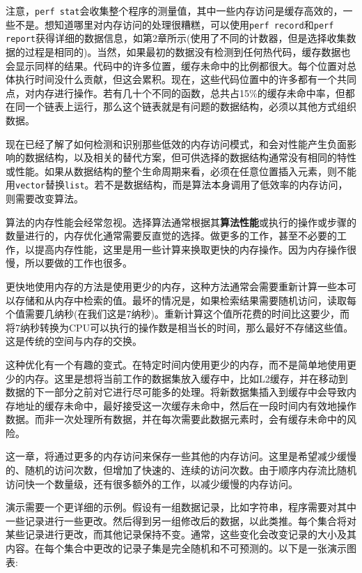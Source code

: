注意，\texttt{perf stat}会收集整个程序的测量值，其中一些内存访问是缓存高效的，一些不是。想知道哪里对内存访问的处理很糟糕，可以使用\texttt{perf record}和\texttt{perf report}获得详细的数据信息，如第2章所示(使用了不同的计数器，但是选择收集数据的过程是相同的)。当然，如果最初的数据没有检测到任何热代码，缓存数据也会显示同样的结果。代码中的许多位置，缓存未命中的比例都很大。每个位置对总体执行时间没什么贡献，但这会累积。现在，这些代码位置中的许多都有一个共同点，对内存进行操作。若有几十个不同的函数，总共占15\%的缓存未命中率，但都在同一个链表上运行，那么这个链表就是有问题的数据结构，必须以其他方式组织数据。

现在已经了解了如何检测和识别那些低效的内存访问模式，和会对性能产生负面影响的数据结构，以及相关的替代方案，但可供选择的数据结构通常没有相同的特性或性能。如果从数据结构的整个生命周期来看，必须在任意位置插入元素，则不能用\texttt{vector}替换\texttt{list}。若不是数据结构，而是算法本身调用了低效率的内存访问，则需要改变算法。


算法的内存性能会经常忽视。选择算法通常根据其\textbf{算法性能}或执行的操作或步骤的数量进行的，内存优化通常需要反直觉的选择。做更多的工作，甚至不必要的工作，以提高内存性能，这里是用一些计算来换取更快的内存操作。因为内存操作很慢，所以要做的工作也很多。

更快地使用内存的方法是使用更少的内存，这种方法通常会需要重新计算一些本可以存储和从内存中检索的值。最坏的情况是，如果检索结果需要随机访问，读取每个值需要几纳秒(在我们这是7纳秒)。重新计算这个值所花费的时间比这要少，而将7纳秒转换为CPU可以执行的操作数是相当长的时间，那么最好不存储这些值。这是传统的空间与内存的交换。

这种优化有一个有趣的变式。在特定时间内使用更少的内存，而不是简单地使用更少的内存。这里是想将当前工作的数据集放入缓存中，比如L2缓存，并在移动到数据的下一部分之前对它进行尽可能多的处理。将新数据集插入到缓存中会导致内存地址的缓存未命中，最好接受这一次缓存未命中，然后在一段时间内有效地操作数据。而非一次处理所有数据，并在每次需要此数据元素时，会有缓存未命中的风险。

这一章，将通过更多的内存访问来保存一些其他的内存访问。这里是希望减少缓慢的、随机的访问次数，但增加了快速的、连续的访问次数。由于顺序内存流比随机访问快一个数量级，还有很多额外的工作，以减少缓慢的内存访问。

演示需要一个更详细的示例。假设有一组数据记录，比如字符串，程序需要对其中一些记录进行一些更改。然后得到另一组修改后的数据，以此类推。每个集合将对某些记录进行更改，而其他记录保持不变。通常，这些变化会改变记录的大小及其内容。在每个集合中更改的记录子集是完全随机和不可预测的。以下是一张演示图表:

